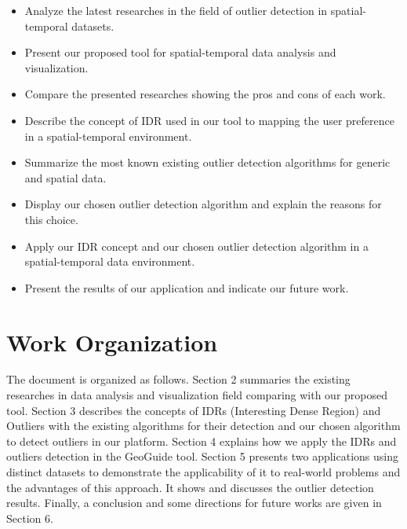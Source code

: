 \begin{itemize}
	\item
	      Analyze the latest researches in the field of outlier detection in spatial-temporal
	      datasets.
	\item
	      Present our proposed tool for spatial-temporal data analysis and visualization.
	\item
	      Compare the presented researches showing the pros and cons of each work.
	\item
	      Describe the concept of IDR used in our tool to mapping the user preference in a
	      spatial-temporal environment.
	\item
	      Summarize the most known existing outlier detection algorithms for generic and spatial
	      data.
	\item
	      Display our chosen outlier detection algorithm and explain the reasons for this choice.
	\item
	      Apply our IDR concept and our chosen outlier detection algorithm in a spatial-temporal
	      data environment.
	\item
	      Present the results of our application and indicate our future work.

\end{itemize}



\section{Work Organization}

The document is organized as follows. Section 2 summaries the existing researches
in data analysis and visualization field comparing with our proposed tool. Section 3 describes
the concepts of IDRs (Interesting Dense Region) and Outliers with the existing algorithms for
their detection and our chosen algorithm to detect outliers in our platform. Section 4 explains
how we apply the IDRs and outliers detection in the GeoGuide tool. Section 5 presents two
applications using distinct datasets to demonstrate the applicability of it to real-world
problems and the advantages of this approach. It shows and discusses the outlier detection
results. Finally, a conclusion and some directions for future works are given in Section 6.
